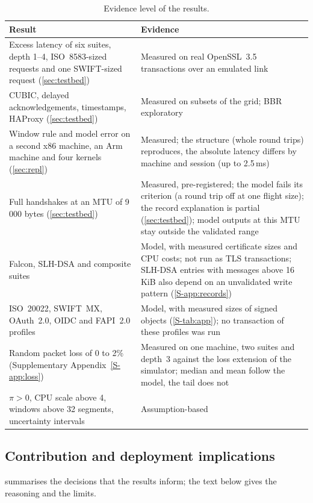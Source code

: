\documentclass[preprint,12pt]{elsarticle}
\newcommand{\ms}{\,ms\xspace}
\begin{document}
\begin{table}[t]
\centering\small
\caption{Evidence level of the results.}
\label{tab:evidence}
\renewcommand{\arraystretch}{1.05}
\begin{tabularx}{\textwidth}{@{}>{\raggedright\arraybackslash}p{}>{\raggedright\arraybackslash}X@{}}
\toprule
Result & Evidence \\
\midrule
Excess latency of six suites, depth 1--4, ISO~8583-sized requests and one SWIFT-sized request (\cref{sec:testbed}) & Measured on real OpenSSL~3.5 transactions over an emulated link \\
CUBIC, delayed acknowledgements, timestamps, HAProxy (\cref{sec:testbed}) & Measured on subsets of the grid; BBR exploratory \\
Window rule and model error on a second x86 machine, an Arm machine and four kernels (\cref{sec:repl}) & Measured; the structure (whole round trips) reproduces, the absolute latency differs by machine and session (up to 2.5\ms) \\
Full handshakes at an MTU of 9\,000 bytes (\cref{sec:testbed}) & Measured, pre-registered; the model fails its criterion (a round trip off at one flight size); the record explanation is partial (\cref{sec:testbed}); model outputs at this MTU stay outside the validated range \\
Falcon, SLH-DSA and composite suites & Model, with measured certificate sizes and CPU costs; not run as TLS transactions; SLH-DSA entries with messages above 16\,KiB also depend on an unvalidated write pattern (\cref{S-app:records}) \\
ISO~20022, SWIFT~MX, OAuth~2.0, OIDC and FAPI~2.0 profiles & Model, with measured sizes of signed objects (\cref{S-tab:app}); no transaction of these profiles was run \\
Random packet loss of 0 to 2\% (Supplementary Appendix~\ref{S-app:loss}) & Measured on one machine, two suites and depth~3 against the loss extension of the simulator; median and mean follow the model, the tail does not \\
$\pi>0$, CPU scale above 4, windows above 32 segments, uncertainty intervals & Assumption-based \\
\bottomrule
\end{tabularx}
\end{table}

\subsection{Contribution and deployment implications}
 summarises the decisions that the results inform; the text below gives the reasoning and the limits.
\end{document}
